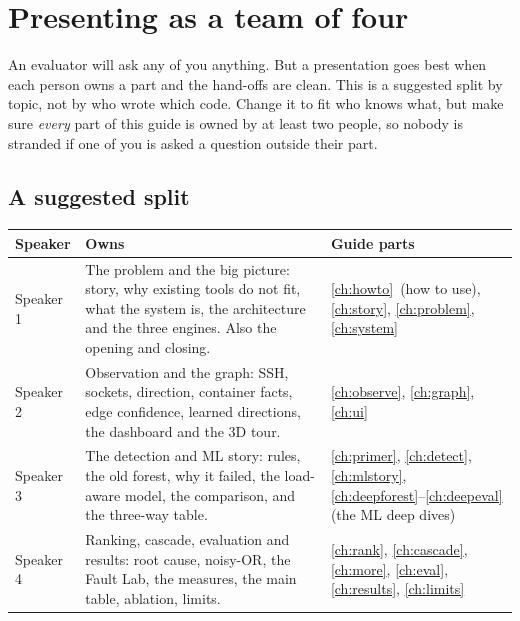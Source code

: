 \chapter{Presenting as a team of four}
\label{ch:roles}

An evaluator will ask any of you anything. But a presentation goes best when each person owns a part and the hand-offs are clean. This is a suggested split by topic, not by who wrote which code. Change it to fit who knows what, but make sure \emph{every} part of this guide is owned by at least two people, so nobody is stranded if one of you is asked a question outside their part.

\section{A suggested split}
\begin{center}
\small
\begin{tabularx}{\textwidth}{>{\raggedright\arraybackslash}p{2.2cm}>{\raggedright\arraybackslash}p{4.4cm}>{\raggedright\arraybackslash}X}
\toprule
\textbf{Speaker} & \textbf{Owns} & \textbf{Guide parts}\\
\midrule
Speaker 1 & The problem and the big picture: story, why existing tools do not fit, what the system is, the architecture and the three engines. Also the opening and closing. & \ref{ch:howto}\ (how to use), \ref{ch:story}, \ref{ch:problem}, \ref{ch:system}\\
Speaker 2 & Observation and the graph: SSH, sockets, direction, container facts, edge confidence, learned directions, the dashboard and the 3D tour. & \ref{ch:observe}, \ref{ch:graph}, \ref{ch:ui}\\
Speaker 3 & The detection and ML story: rules, the old forest, why it failed, the load-aware model, the comparison, and the three-way table. & \ref{ch:primer}, \ref{ch:detect}, \ref{ch:mlstory}, \ref{ch:deepforest}--\ref{ch:deepeval} (the ML deep dives)\\
Speaker 4 & Ranking, cascade, evaluation and results: root cause, noisy-OR, the Fault Lab, the measures, the main table, ablation, limits. & \ref{ch:rank}, \ref{ch:cascade}, \ref{ch:more}, \ref{ch:eval}, \ref{ch:results}, \ref{ch:limits}\\
\bottomrule
\end{tabularx}
\end{center}

